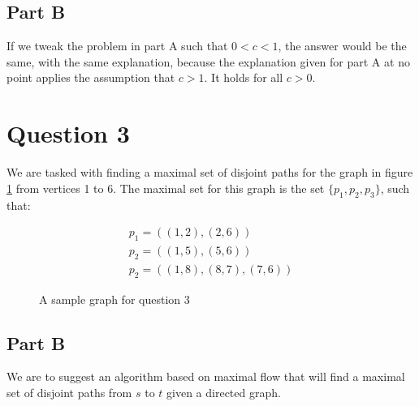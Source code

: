 \documentclass{article}
\begin{document}
\subsection*{Part B}

If we tweak the problem in part A such that \(0 < c < 1\), the answer would be the same, with the same explanation, because the explanation given for part A at no point applies the assumption that \(c > 1\). It holds for all \(c > 0\).

\section*{Question 3}

We are tasked with finding a maximal set of disjoint paths for the graph in figure \ref{q3} from vertices 1 to 6. The maximal set for this graph is the set \(\{p_1, p_2, p_3\}\), such that:

\begin{gather*}
	p_1 = ((1,2), (2,6)) \\
	p_2 = ((1,5), (5,6)) \\
	p_2 = ((1,8), (8,7), (7,6))
\end{gather*}

\begin{figure}[htbp]
	\centering
	\caption{A sample graph for question 3}
	\label{q3}
\end{figure}

\subsection*{Part B}

We are to suggest an algorithm based on maximal flow that will find a maximal set of disjoint paths from \(s\) to \(t\) given a directed graph.
\end{document}
